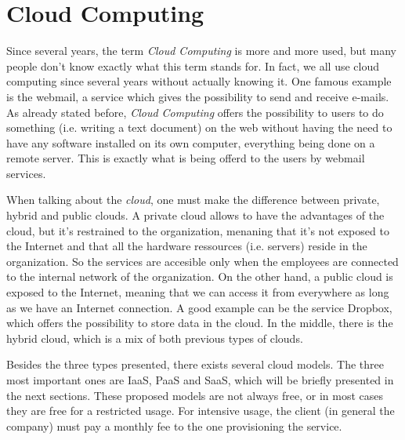 

\chapter{Cloud Computing}
Since several years, the term \textit{Cloud Computing} is more and more used, but many people don't know exactly what this term stands for. 
In fact, we all use cloud computing since several years without actually knowing it. One famous example is the webmail, a service which gives the possibility to send and receive e-mails.
As already stated before, \textit{Cloud Computing} offers the possibility to users to do something (i.e. writing a text document) on the web without having the need to have any software installed on its own computer, everything being done on a remote server. 
This is exactly what is being offerd to the users by webmail services.

When talking about the \textit{cloud}, one must make the difference between private, hybrid and public clouds. 
A private cloud allows to have the advantages of the cloud, but it's restrained to the organization, menaning that it's not exposed to the Internet and that all the hardware ressources (i.e. servers) reside in the organization. 
So the services are accesible only when the employees are connected to the internal network of the organization. 
On the other hand, a public cloud is exposed to the Internet, meaning that we can access it from everywhere as long as we have an Internet connection. 
A good example can be the service Dropbox, which offers the possibility to store data in the cloud. 
In the middle, there is the hybrid cloud, which is a mix of both previous types of clouds.

Besides the three types presented, there exists several cloud models. The three most important ones are IaaS, PaaS and SaaS, which will be briefly presented in the next sections. 
These proposed models are not always free, or in most cases they are free for a restricted usage. 
For intensive usage, the client (in general the company) must pay a monthly fee to the one provisioning the service.





